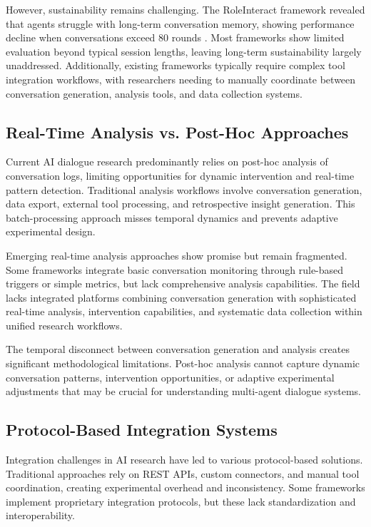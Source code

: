 \documentclass[11pt,letterpaper]{article}
\begin{document}
However, sustainability remains challenging. The RoleInteract framework revealed that agents struggle with long-term conversation memory, showing performance decline when conversations exceed 80 rounds \citep{chen2023chatarena}. Most frameworks show limited evaluation beyond typical session lengths, leaving long-term sustainability largely unaddressed. Additionally, existing frameworks typically require complex tool integration workflows, with researchers needing to manually coordinate between conversation generation, analysis tools, and data collection systems.

\subsection{Real-Time Analysis vs. Post-Hoc Approaches}

Current AI dialogue research predominantly relies on post-hoc analysis of conversation logs, limiting opportunities for dynamic intervention and real-time pattern detection. Traditional analysis workflows involve conversation generation, data export, external tool processing, and retrospective insight generation. This batch-processing approach misses temporal dynamics and prevents adaptive experimental design.

Emerging real-time analysis approaches show promise but remain fragmented. Some frameworks integrate basic conversation monitoring through rule-based triggers or simple metrics, but lack comprehensive analysis capabilities. The field lacks integrated platforms combining conversation generation with sophisticated real-time analysis, intervention capabilities, and systematic data collection within unified research workflows.

The temporal disconnect between conversation generation and analysis creates significant methodological limitations. Post-hoc analysis cannot capture dynamic conversation patterns, intervention opportunities, or adaptive experimental adjustments that may be crucial for understanding multi-agent dialogue systems.

\subsection{Protocol-Based Integration Systems}

Integration challenges in AI research have led to various protocol-based solutions. Traditional approaches rely on REST APIs, custom connectors, and manual tool coordination, creating experimental overhead and inconsistency. Some frameworks implement proprietary integration protocols, but these lack standardization and interoperability.
\end{document}
